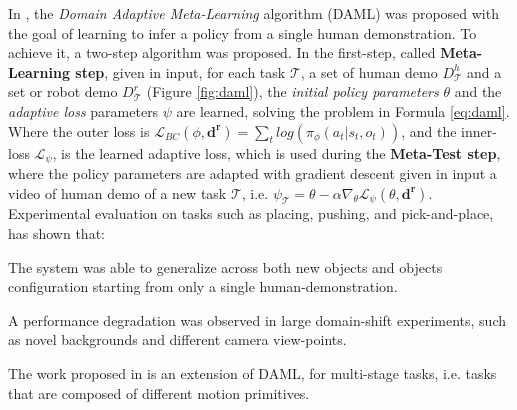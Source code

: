 \newline In \cite{yu2018daml}, the \textit{Domain Adaptive Meta-Learning} algorithm (DAML) was proposed with the goal of learning to infer a policy from a single human demonstration. To achieve it, a two-step algorithm was proposed. In the first-step, called \textbf{Meta-Learning step}, given in input, for each task $\mathcal{T}$, a set of human demo $D^{h}_{\mathcal{T}}$ and a set or robot demo $D^{r}_{\mathcal{T}}$ (Figure \ref{fig:daml}), the \textit{initial policy parameters} $\theta$ and the \textit{adaptive loss} parameters $\psi$ are learned, solving the problem in Formula \ref{eq:daml}. 
\newline Where the outer loss is $\mathcal{L}_{BC}(\phi,\mathbf{d^{r}}) = \sum_{t} log(\pi_{\phi}(a_{t}|s_{t},o_{t}))$, and the inner-loss $\mathcal{L}_{\psi}$, is the learned adaptive loss, which is used during the \textbf{Meta-Test step}, where the policy parameters are adapted with gradient descent given in input a video of human demo of a new task $\mathcal{T}$, i.e. $\psi_{\mathcal{T}} = \theta - \alpha \nabla_{\theta} \mathcal{L}_{\psi}(\theta, \mathbf{d^{r}})$. Experimental evaluation on tasks such as placing, pushing, and pick-and-place, has shown that: \begin{enumerate*}[label=\textbf{(\alph*)}]
    \item The system was able to generalize across both new objects and objects configuration starting from only a single human-demonstration.
    \item A performance degradation was observed in large domain-shift experiments, such as novel backgrounds and different camera view-points.
\end{enumerate*}
The work proposed in \cite{yu2018one_shot_hil} is an extension of DAML, for multi-stage tasks, i.e. tasks that are composed of different motion primitives. 

